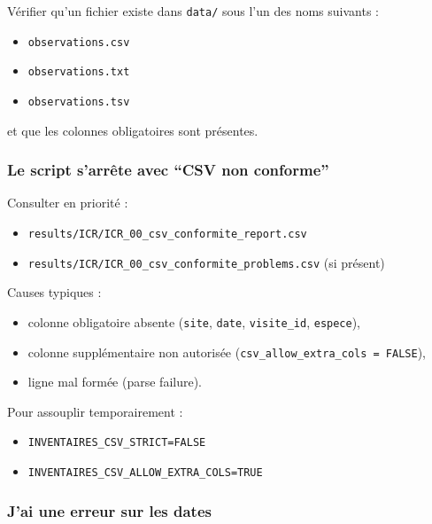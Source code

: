 Vérifier qu'un fichier existe dans \texttt{data/} sous l'un des noms
suivants :

\begin{itemize}
\tightlist
\item
  \texttt{observations.csv}
\item
  \texttt{observations.txt}
\item
  \texttt{observations.tsv}
\end{itemize}

et que les colonnes obligatoires sont présentes.

\subsubsection{Le script s'arrête avec ``CSV non
conforme''}\label{le-script-sarruxeate-avec-csv-non-conforme}

Consulter en priorité :

\begin{itemize}
\tightlist
\item
  \texttt{results/ICR/ICR\_00\_csv\_conformite\_report.csv}
\item
  \texttt{results/ICR/ICR\_00\_csv\_conformite\_problems.csv} (si
  présent)
\end{itemize}

Causes typiques :

\begin{itemize}
\tightlist
\item
  colonne obligatoire absente (\texttt{site}, \texttt{date},
  \texttt{visite\_id}, \texttt{espece}),
\item
  colonne supplémentaire non autorisée
  (\texttt{csv\_allow\_extra\_cols\ =\ FALSE}),
\item
  ligne mal formée (parse failure).
\end{itemize}

Pour assouplir temporairement :

\begin{itemize}
\tightlist
\item
  \texttt{INVENTAIRES\_CSV\_STRICT=FALSE}
\item
  \texttt{INVENTAIRES\_CSV\_ALLOW\_EXTRA\_COLS=TRUE}
\end{itemize}

\subsubsection{J'ai une erreur sur les
dates}\label{jai-une-erreur-sur-les-dates}

